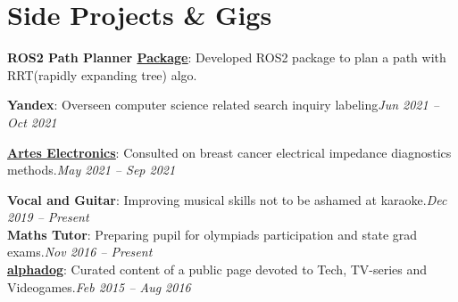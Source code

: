 \section{Side Projects \& Gigs}
\resumeSubHeadingListStart
      \resumeProjectHeading
      {\textbf{ROS2 Path Planner \href{https://github.com/aaptss/route_planning_ros2}{\underline{Package}}}{: Developed ROS2 package to plan a path with RRT(rapidly expanding tree) algo.}}
      
      \resumeProjectHeading
      {\textbf{Yandex}{: Overseen computer science related search inquiry labeling}}{\emph{Jun 2021 -- Oct 2021}}

      \resumeProjectHeading
      {\textbf{\href{https://notamole.com/}{\underline{Artes Electronics}}}{: Consulted on breast cancer electrical impedance diagnostics methods.}}{\emph{May 2021 -- Sep 2021}}

      \resumeProjectHeading
      {\textbf{Vocal and Guitar}{: Improving musical skills not to be ashamed at karaoke.}}{\emph{Dec 2019 -- Present}} \\
      
      \resumeProjectHeading
      {\textbf{Maths Tutor}{: Preparing pupil for olympiads participation and state grad exams.}}{\emph{Nov 2016 -- Present}} \\
      
      \resumeProjectHeading
      {\textbf{\href{https://vk.com/alpha_dogs}{\underline{alphadog}}}{: Curated content of a public page devoted to Tech, TV-series and Videogames.}}{\emph{Feb 2015 -- Aug 2016}} \\
      
\resumeSubHeadingListEnd